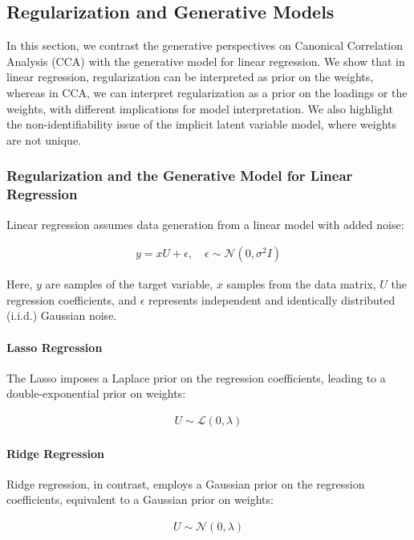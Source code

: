 \subsection{Regularization and Generative Models}

In this section, we contrast the generative perspectives on Canonical Correlation Analysis (CCA) with the generative model for linear regression.
We show that in linear regression, regularization can be interpreted as prior on the weights, whereas in CCA, we can interpret regularization as a prior on the loadings or the weights, with different implications for model interpretation.
We also highlight the non-identifiability issue of the implicit latent variable model, where weights are not unique.

\subsubsection{Regularization and the Generative Model for Linear Regression}
Linear regression assumes data generation from a linear model with added noise:

\begin{align}
    y = xU + \epsilon, \quad \epsilon \sim \mathcal{N}(0, \sigma^2 I)
\end{align}

Here, $y$ are samples of the target variable, $x$ samples from the data matrix, $U$ the regression coefficients, and $\epsilon$ represents independent and identically distributed (i.i.d.) Gaussian noise.

\paragraph{Lasso Regression}
The Lasso imposes a Laplace prior on the regression coefficients, leading to a double-exponential prior on weights:

\begin{align}
    U \sim \mathcal{L}(0, \lambda)
\end{align}

\paragraph{Ridge Regression}
Ridge regression, in contrast, employs a Gaussian prior on the regression coefficients, equivalent to a Gaussian prior on weights:

\begin{align}
    U \sim \mathcal{N}(0, \lambda)
\end{align}

